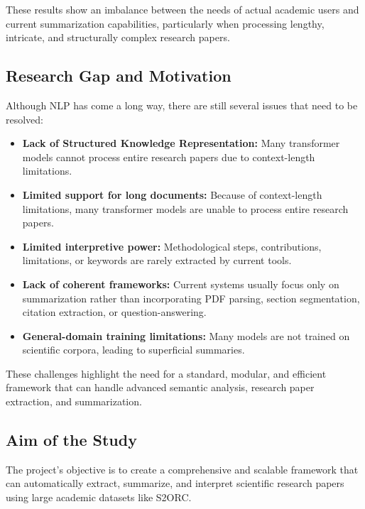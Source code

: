 \documentclass[conference]{IEEEtran}
\begin{document}
These results show an imbalance between the needs of actual academic users and current summarization capabilities, particularly when processing lengthy, intricate, and structurally complex research papers.

\subsection{Research Gap and Motivation}
Although NLP has come a long way, there are still several issues that need to be resolved:

\begin{itemize}
    \item \textbf{Lack of Structured Knowledge Representation:} Many transformer models cannot process entire research papers due to context-length limitations.
    \item \textbf{Limited support for long documents:} Because of context-length limitations, many transformer models are unable to process entire research papers.
    \item \textbf{Limited interpretive power:} Methodological steps, contributions, limitations, or keywords are rarely extracted by current tools.
    \item \textbf{Lack of coherent frameworks:} Current systems usually focus only on summarization rather than incorporating PDF parsing, section segmentation, citation extraction, or question-answering.
    \item \textbf{General-domain training limitations:} Many models are not trained on scientific corpora, leading to superficial summaries.
\end{itemize}

These challenges highlight the need for a standard, modular, and efficient framework that can handle advanced semantic analysis, research paper extraction, and summarization.

\subsection{Aim of the Study}
The project's objective is to create a comprehensive and scalable framework that can automatically extract, summarize, and interpret scientific research papers using large academic datasets like S2ORC.
\end{document}
